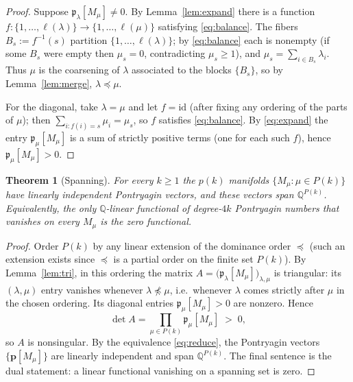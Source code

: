 \documentclass[12pt]{article}
\newtheorem{theorem}{Theorem}
\theoremstyle{definition}
\begin{document}
\begin{proof}
Suppose $\mathfrak{p}_\lambda[M_\mu]\neq 0$.  By Lemma~\ref{lem:expand} there is a
function $f:\{1,\dots,\ell(\lambda)\}\to\{1,\dots,\ell(\mu)\}$ satisfying
\eqref{eq:balance}.  The fibers $B_s:=f^{-1}(s)$ partition $\{1,\dots,\ell(\lambda)\}$; by
\eqref{eq:balance} each is nonempty (if some $B_s$ were empty then $\mu_s=0$, contradicting
$\mu_s\ge 1$), and $\mu_s=\sum_{i\in B_s}\lambda_i$.  Thus $\mu$ is the coarsening of
$\lambda$ associated to the blocks $\{B_s\}$, so by Lemma~\ref{lem:merge},
$\lambda\preceq\mu$.

For the diagonal, take $\lambda=\mu$ and let $f=\mathrm{id}$ (after fixing any ordering of
the parts of $\mu$); then $\sum_{i:f(i)=s}\mu_i=\mu_s$, so $f$ satisfies \eqref{eq:balance}.
By \eqref{eq:expand} the entry $\mathfrak{p}_\mu[M_\mu]$ is a sum of strictly positive terms
(one for each such $f$), hence $\mathfrak{p}_\mu[M_\mu]>0$.
\end{proof}

\begin{theorem}[Spanning]\label{thm:span}
For every $k\ge 1$ the $p(k)$ manifolds $\{M_\mu:\mu\in P(k)\}$ have linearly independent
Pontryagin vectors, and these vectors span $\mathbb{Q}^{P(k)}$.  Equivalently, the only
$\mathbb{Q}$-linear functional of degree-$4k$ Pontryagin numbers that vanishes on every
$M_\mu$ is the zero functional.
\end{theorem}

\begin{proof}
Order $P(k)$ by any linear extension of the dominance order $\preceq$ (such an extension
exists since $\preceq$ is a partial order on the finite set $P(k)$).  By
Lemma~\ref{lem:tri}, in this ordering the matrix
$A=\big(\mathfrak{p}_\lambda[M_\mu]\big)_{\lambda,\mu}$ is triangular: its $(\lambda,\mu)$
entry vanishes whenever $\lambda\not\preceq\mu$, i.e.\ whenever $\lambda$ comes strictly
after $\mu$ in the chosen ordering.  Its diagonal entries
$\mathfrak{p}_\mu[M_\mu]>0$ are nonzero.  Hence
\[
\det A=\prod_{\mu\in P(k)}\mathfrak{p}_\mu[M_\mu]\;>\;0,
\]
so $A$ is nonsingular.  By the equivalence \eqref{eq:reduce}, the Pontryagin vectors
$\{\mathbf{p}[M_\mu]\}$ are linearly independent and span $\mathbb{Q}^{P(k)}$.  The final
sentence is the dual statement: a linear functional vanishing on a spanning set is zero.
\end{proof}
\end{document}
